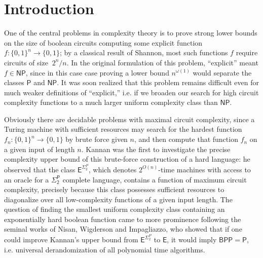 \documentclass[11pt]{article}
\newcommand{\B}{\{0,1\}}
\begin{document}
\newpage

\section{Introduction}
One of the central problems in complexity theory is to prove strong lower bounds on the size of boolean circuits computing some explicit function $f: \B^n \to \B$; by a classical result of Shannon, most such functions $f$ require circuits of size $~ 2^n/n$. In the original formulation of this problem, ``explicit'' meant $f \in \mathsf{NP}$, since in this case case proving a lower bound $n^{\omega(1)}$ would separate the classes $\mathsf{P}$ and $\mathsf{NP}$. It was soon realized that this problem remains difficult even for much weaker definitions of ``explicit,'' i.e. if we broaden our search for high circuit complexity functions to a much larger uniform complexity class than $\mathsf{NP}$. 

Obviously there are decidable problems with maximal circuit complexity, since a Turing machine with sufficient resources may search for the hardest function $f_n: \B^n \to \B$ by brute force given $n$, and then compute that function $f_n$ on a given input of length $n$. Kannan \cite{Kannan} was the first to investigate the precise complexity upper bound of this brute-force construction of a hard language: he observed that the class $\mathsf{E}^{\Sigma_2^P}$, which denotes $2^{O(n)}$-time machines with access to an oracle for a $\mathsf{\Sigma_2^P}$ complete language, contains a function of maximum circuit complexity, precisely because this class possesses sufficient resources to diagonalize over all low-complexity functions of a given input length. The question of finding the smallest uniform complexity class containing an exponentially hard boolean function came to more prominence following the seminal works of Nisan, Wigderson and Impagliazzo\cite{NW,IW}, who showed that if one could improve Kannan's upper bound from $\mathsf{E}^{\Sigma_2^P} $ to $\mathsf{E}$, it would imply $\mathsf{BPP}=\mathsf{P}$, i.e. universal derandomization of all polynomial time algorithms.
\end{document}

